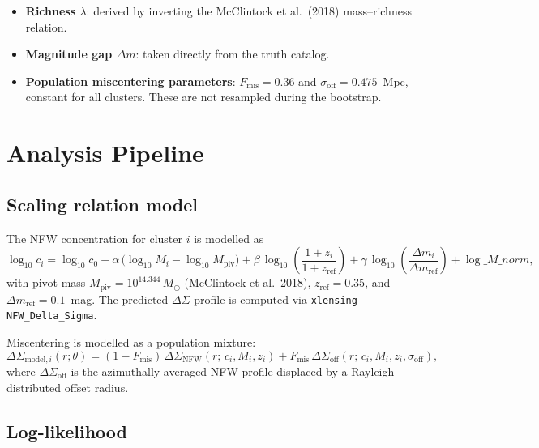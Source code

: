\documentclass[11pt,a4paper]{article}
\begin{document}
\begin{itemize}
  \item \textbf{Richness $\lambda$}: derived by inverting the
        McClintock et al.\ (2018) mass--richness relation.
  \item \textbf{Magnitude gap $\Delta m$}: taken directly from the truth catalog.
  \item \textbf{Population miscentering parameters}: $F_\mathrm{mis} = 0.36$ and
        $\sigma_\mathrm{off} = 0.475$~Mpc, constant for all clusters.
        These are not resampled during the bootstrap.
\end{itemize}

\section{Analysis Pipeline}

\subsection{Scaling relation model}
\label{sec:model}

The NFW concentration for cluster $i$ is modelled as
\begin{equation}
  \log_{10} c_i = \log_{10} c_0
  + \alpha\,\bigl(\log_{10} M_i - \log_{10} M_\mathrm{piv}\bigr)
  + \beta\,\log_{10}\!\left(\frac{1+z_i}{1+z_\mathrm{ref}}\right)
  + \gamma\,\log_{10}\!\left(\frac{\Delta m_i}{\Delta m_\mathrm{ref}}\right)
  + \log\_M\_norm,
  \label{eq:scaling}
\end{equation}
with pivot mass $M_\mathrm{piv} = 10^{14.344}\,M_\odot$ (McClintock et al.\ 2018),
$z_\mathrm{ref} = 0.35$, and $\Delta m_\mathrm{ref} = 0.1$~mag.
The predicted $\Delta\Sigma$ profile is computed via \texttt{xlensing}
\texttt{NFW\_Delta\_Sigma}.

Miscentering is modelled as a population mixture:
\begin{equation}
  \Delta\Sigma_{\mathrm{model},i}(r;\theta)
  = (1 - F_\mathrm{mis})\,\Delta\Sigma_\mathrm{NFW}(r;\,c_i,M_i,z_i)
  + F_\mathrm{mis}\,\Delta\Sigma_\mathrm{off}(r;\,c_i,M_i,z_i,\sigma_\mathrm{off}),
  \label{eq:miscenter_model}
\end{equation}
where $\Delta\Sigma_\mathrm{off}$ is the azimuthally-averaged NFW profile
displaced by a Rayleigh-distributed offset radius.

\subsection{Log-likelihood}
\label{sec:likelihood}
\end{document}
